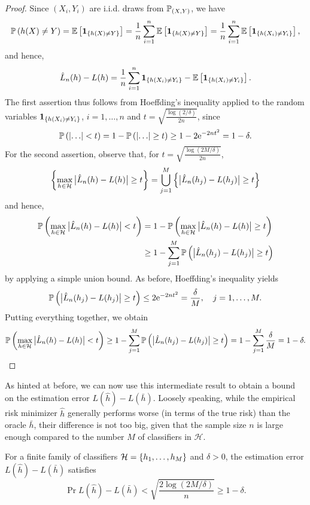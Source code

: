 \begin{proof}
Since $(X_i, Y_i)$ are i.i.d. draws from $\P_{(X, Y)}$, we have
\[
    \Pr{h(X) \neq Y} = \Ex{\indSet{h(X) \neq Y}} = \frac{1}{n} \sum_{i=1}^n \Ex{\indSet{h(X) \neq Y}} = \frac{1}{n} \sum_{i=1}^n \Ex{\indSet{h(X_i) \neq Y_i}},
\]
and hence,
\[
    \hat L_n(h) - L(h) = \frac{1}{n} \sum_{i=1}^n \indSet{h(X_i) \neq Y_i} - \Ex{\indSet{h(X_i) \neq Y_i}}.
\]
The first assertion thus follows from Hoeffding's inequality applied to the random variables $\indSet{h(X_i) \neq Y_i}$, $i = 1, \dots, n$ and $t = \sqrt{\frac{\log(2/\delta)}{2n}}$, since
\[
    \Pr{\abs{\ldots} < t} = 1 - \Pr{\abs{\ldots} \geq t} \geq 1 - 2\e^{-2nt^2} = 1 - \delta.
\]
For the second assertion, observe that, for $t = \sqrt{\frac{\log(2M/\delta)}{2n}}$,
\[
    \set{\max_{h \in \mathcal{H}} \bigAbs{ \hat L_n(h) - L(h) } \geq t} = \bigcup_{j=1}^M \set{\bigAbs{ \hat L_n(h_j) - L(h_j) } \geq t}
\]
and hence,
\begin{align*}
    \Pr{\max_{h \in \mathcal{H}} \bigAbs{ \hat L_n(h) - L(h) } < t} &= 1 - \Pr{\max_{h \in \mathcal{H}} \bigAbs{ \hat L_n(h) - L(h) } \geq t} \\
        &\geq 1 - \sum_{j=1}^M \Pr{\bigAbs{ \hat L_n(h_j) - L(h_j) } \geq t}
\end{align*}
by applying a simple union bound. As before, Hoeffding's inequality yields
\[
    \Pr{\bigAbs{ \hat L_n(h_j) - L(h_j) } \geq t} \leq 2\e^{-2nt^2} = \frac{\delta}{M}, \quad j = 1, \dots, M.
\]
Putting everything together, we obtain
\[
    \Pr{\max_{h \in \mathcal{H}} \bigAbs{ \hat L_n(h) - L(h) } < t} \geq 1 - \sum_{j=1}^M \Pr{\bigAbs{ \hat L_n(h_j) - L(h_j) } \geq t} = 1 - \sum_{j=1}^M \frac{\delta}{M} = 1 - \delta.
\]
\end{proof}

As hinted at before, we can now use this intermediate result to obtain a bound on the estimation error $L(\hat h) - L(\bar h)$. Loosely speaking, while the empirical risk minimizer $\hat h$ generally performs worse (in terms of the true risk) than the oracle $\bar h$, their difference is not too big, given that the sample size $n$ is large enough compared to the number $M$ of classifiers in $\mathcal{H}$.

\begin{theorem}
\label{thm: estimation error finite dictionary}
For a finite family of classifiers $\mathcal{H} = \set{h_1, \dots, h_M}$ and $\delta > 0$, the estimation error $L(\hat h) - L(\bar h)$ satisfies
\[
    \Pr{L(\hat h) - L(\bar h) < \sqrt{\frac{2\log(2M/\delta)}{n}}} \geq 1 - \delta.
\]
\end{theorem}

